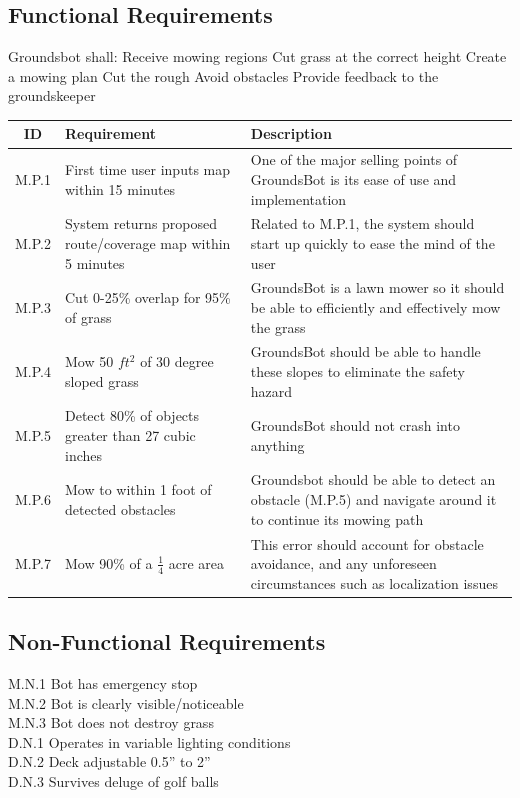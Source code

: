 \documentclass{article}
\begin{document}
\subsection{Functional Requirements}
Groundsbot shall:
  Receive mowing regions
  Cut grass at the correct height
  Create a mowing plan
  Cut the rough 
  Avoid obstacles
  Provide feedback to the groundskeeper
\begin{center}
\begin{tabularx}{\textwidth}{ |c|X|X| }
  \hline
    ID & Requirement & Description \\
  \hline
    M.P.1 &
    First time user inputs map within 15 minutes &
    One of the major selling points of GroundsBot is its ease of use and implementation \\
  \hline
    M.P.2 &
    System returns proposed route/coverage map within 5 minutes &
    Related to M.P.1, the system should start up quickly to ease the mind of the user \\
  \hline
    M.P.3 &
    Cut 0-25\% overlap for 95\% of grass &
    GroundsBot is a lawn mower so it should be able to efficiently and effectively mow the grass \\
  \hline
  	M.P.4 &
  	Mow 50 $ft^2$ of 30 degree sloped grass &
  	GroundsBot should be able to handle these slopes to eliminate the safety hazard \\
  \hline
  	M.P.5 &
  	Detect 80\% of objects greater than 27 cubic inches &
  	GroundsBot should not crash into anything \\
  \hline
  	M.P.6 &
  	Mow to within 1 foot of detected obstacles &
  	Groundsbot should be able to detect an obstacle (M.P.5) and navigate around it to continue its mowing path \\
  \hline
  	M.P.7 &
  	Mow 90\% of a $\frac{1}{4}$ acre area &
  	This error should account for obstacle avoidance, and any unforeseen circumstances such as localization issues \\
  \hline
\end{tabularx}
\end{center}

\subsection{Non-Functional Requirements}
M.N.1 Bot has emergency stop \\
M.N.2 Bot is clearly visible/noticeable \\
M.N.3 Bot does not destroy grass \\
D.N.1 Operates in variable lighting conditions \\
D.N.2 Deck adjustable 0.5” to 2” \\
D.N.3 Survives deluge of golf balls \\
\end{document}
